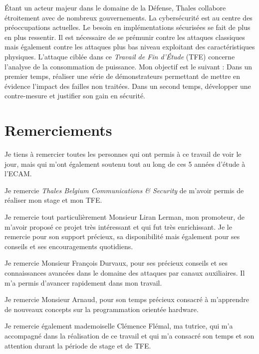 \documentclass[oneside]{book}
\begin{document}
Étant un acteur majeur dans le domaine de la Défense, Thales collabore étroitement avec de nombreux gouvernements. La cybersécurité est au centre des préoccupations actuelles. Le besoin en implémentations sécurisées se fait de plus en plus ressentir. Il est nécessaire de se prémunir contre les attaques classiques mais également contre les attaques plus bas niveau exploitant des caractéristiques physiques. L'attaque ciblée dans ce \textit{Travail de Fin d'Étude} (TFE) concerne l'analyse de la consommation de puissance. Mon objectif est le suivant : Dans un premier temps, réaliser une série de démonstrateurs permettant de mettre en évidence l'impact des failles non traitées. Dans un second temps, développer une contre-mesure et justifier son gain en sécurité.




\newpage
\strut
\thispagestyle{empty}
\newpage

\chapter*{Remerciements}

Je tiens à remercier toutes les personnes qui ont permis à ce travail de voir le jour, mais qui m’ont également soutenu tout au long de ces 5 années d’étude à l’ECAM.

Je remercie \textit{Thales Belgium Communications \& Security} de m’avoir permis de réaliser mon stage et mon TFE.

Je remercie tout particulièrement Monsieur Liran Lerman, mon promoteur, de m’avoir proposé ce projet très intéressant et qui fut très enrichissant. Je le remercie pour son support précieux, sa disponibilité mais également pour ses conseils et ses encouragements quotidiens.

Je remercie Monsieur François Durvaux, pour ses précieux conseils et ses connaissances avancées dans le domaine des attaques par canaux auxiliaires. Il m'a permis d'avancer rapidement dans mon travail.

Je remercie Monsieur Arnaud, pour son temps précieux consacré à m'apprendre de nouveaux concepts sur la programmation orientée hardware. 

Je remercie également mademoiselle Clémence Flémal, ma tutrice, qui m’a accompagné dans la réalisation de ce travail et qui m’a consacré son temps et son attention durant la période de stage et de TFE.
\end{document}
